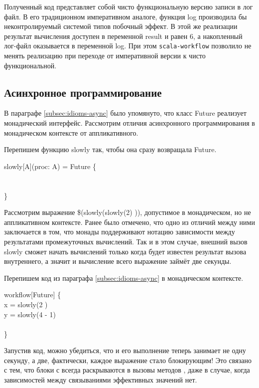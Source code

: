 Полученный код представляет собой чисто функциональную версию записи в лог файл. В его традиционном императивном аналоге, функция \<log\> производила бы неконтролируемый системой типов побочный эффект. В этой же реализации результат вычисления доступен в переменной \<result\> и равен $6$, а накопленный лог-файл оказывается в переменной \<log\>. При этом \texttt{scala-workflow} позволило не менять реализацию при переходе от императивной версии к чисто функциональной.

\subsection{Асинхронное программирование}
В параграфе \ref{subsec:idioms-async} было упомянуто, что класс \<Future\> реализует монадический интерфейс. Рассмотрим отличия асинхронного программирования в монадическом контексте от аппликативного.

Перепишем функцию \<slowly\> так, чтобы она сразу возвращала \<Future\>.

\begin{haskell}
 slowly[A](proc: \Rightarrow A) = Future \{ \\
\\
\\
\}
\end{haskell}

Рассмотрим выражение \<\$(slowly(slowly(2) ))\>, допустимое в монадическом, но не аппликативном контексте. Ранее было отмечено, что одно из отличий между ними заключается в том, что монады поддерживают нотацию зависимости между результатами промежуточных вычислений. Так и в этом случае, внешний вызов \<slowly\> сможет начать вычислений только когда будет известен результат вызова внутреннего, а значит и вычисление всего выражение займёт две секунды.

Перепишем код из параграфа \ref{subsec:idioms-async} в монадическом контексте.

\begin{haskell}
workflow[Future] \{ \\
\quad{} x = slowly(2 ) \\
\quad{} y = slowly(4 - 1) \\
 \\
\}
\end{haskell}

Запустив код, можно убедиться, что и его выполнение теперь занимает не одну секунду, а две, фактически, каждое выражение стало блокирующим! Это связано с тем, что блоки с \<\> всегда раскрываются в вызовы методов \<\>, даже в случае, когда зависимостей между связываниями эффективных значений нет.


